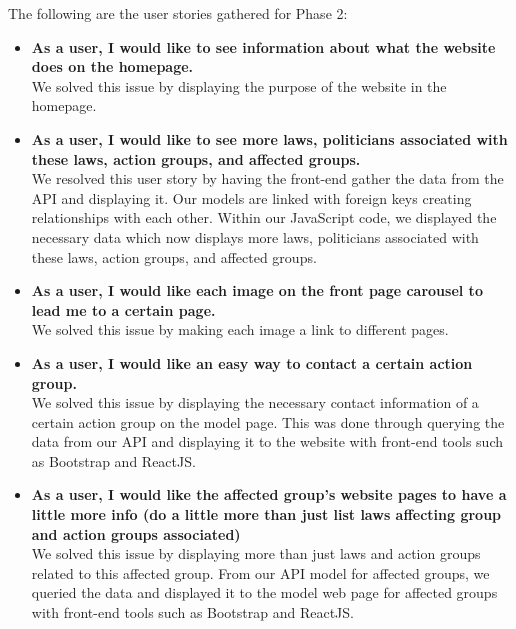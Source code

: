 \documentclass[12pt]{article}
\begin{document}
The following are the user stories gathered for Phase 2: \\
	
\begin{itemize}
	\item\textbf{As a user, I would like to see information about what the website does on the homepage.} \\
	We solved this issue by displaying the purpose of the website in the homepage.
	\\
	
	\item\textbf{As a user, I would like to see more laws, politicians associated with these laws, action groups, and affected groups.} \\
	We resolved this user story by having the front-end gather the data from the API and displaying it. Our models are linked with foreign keys creating relationships with each other. Within our JavaScript code, we displayed the necessary data which now displays more laws, politicians associated with these laws, action groups, and affected groups.
	\\
	
	\item\textbf{As a user, I would like each image on the front page carousel to lead me to a certain page.} \\
	We solved this issue by making each image a link to different pages.
	\\
	
	\item\textbf{As a user, I would like an easy way to contact a certain action group.} \\
	We solved this issue by displaying the necessary contact information of a certain action group on the model page. This was done through querying the data from our API and displaying it to the website with front-end tools such as Bootstrap and ReactJS.
	\\ 
	
	\item\textbf{As a user, I would like the affected group's website pages to have a little more info (do a little more than just list laws affecting group and action groups associated)} \\
	We solved this issue by displaying more than just laws and action groups related to this affected group. From our API model for affected groups, we queried the data and displayed it to the model web page for affected groups with front-end tools such as Bootstrap and ReactJS.
\end{itemize}~\\
\end{document}
